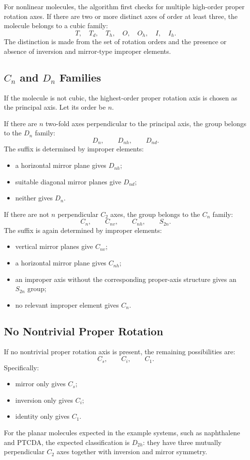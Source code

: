\documentclass[11pt]{article}
\begin{document}
For nonlinear molecules, the algorithm first checks for multiple high-order
proper rotation axes.  If there are two or more distinct axes of order at least
three, the molecule belongs to a cubic family:
\[
    T,\quad T_d,\quad T_h,\quad O,\quad O_h,\quad I,\quad I_h.
\]
The distinction is made from the set of rotation orders and the presence or
absence of inversion and mirror-type improper elements.

\subsection{\(C_n\) and \(D_n\) Families}

If the molecule is not cubic, the highest-order proper rotation axis is chosen
as the principal axis.  Let its order be \(n\).

If there are \(n\) two-fold axes perpendicular to the principal axis, the group
belongs to the \(D_n\) family:
\[
    D_n,\qquad D_{nh},\qquad D_{nd}.
\]
The suffix is determined by improper elements:
\begin{itemize}
    \item a horizontal mirror plane gives \(D_{nh}\);
    \item suitable diagonal mirror planes give \(D_{nd}\);
    \item neither gives \(D_n\).
\end{itemize}

If there are not \(n\) perpendicular \(C_2\) axes, the group belongs to the
\(C_n\) family:
\[
    C_n,\qquad C_{nv},\qquad C_{nh},\qquad S_{2n}.
\]
The suffix is again determined by improper elements:
\begin{itemize}
    \item vertical mirror planes give \(C_{nv}\);
    \item a horizontal mirror plane gives \(C_{nh}\);
    \item an improper axis without the corresponding proper-axis structure gives
    an \(S_{2n}\) group;
    \item no relevant improper element gives \(C_n\).
\end{itemize}

\subsection{No Nontrivial Proper Rotation}

If no nontrivial proper rotation axis is present, the remaining possibilities
are:
\[
    C_s,\qquad C_i,\qquad C_1.
\]
Specifically:
\begin{itemize}
    \item mirror only gives \(C_s\);
    \item inversion only gives \(C_i\);
    \item identity only gives \(C_1\).
\end{itemize}

For the planar molecules expected in the example systems, such as naphthalene
and PTCDA, the expected classification is \(D_{2h}\): they have three mutually
perpendicular \(C_2\) axes together with inversion and mirror symmetry.
\end{document}
